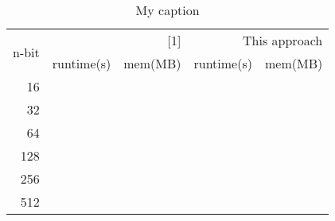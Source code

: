 \begin{table}[]
\centering
\caption{My caption}
\label{my-label}
\begin{tabular}{|r|r|r|r|r|}
\hline
\multirow{2}{*}{n-bit} & \multicolumn{2}{r|}{{[}1{]}} & \multicolumn{2}{r|}{This approach} \\ \cline{2-5} 
 & runtime(s) & mem(MB) & runtime(s) & mem(MB) \\ \hline
16 &  &  &  &  \\ \hline
32 &  &  &  &  \\ \hline
64 &  &  &  &  \\ \hline
128 &  &  &  &  \\ \hline
256 &  &  &  &  \\ \hline
512 &  &  &  &  \\ \hline
\end{tabular}
\end{table}
